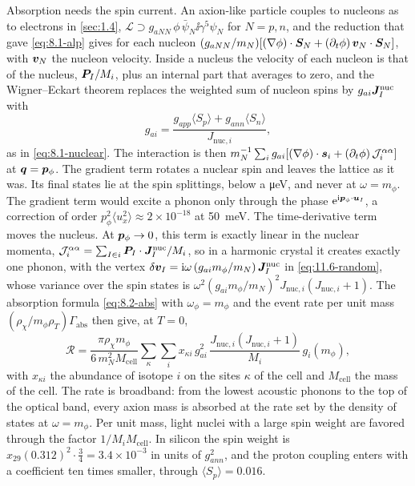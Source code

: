 Absorption needs the spin current. An axion-like particle couples to nucleons as to electrons in \cref{sec:1.4}, $\mathcal{L} \supset g_{aNN}\,\phi\,\bar\psi_N\ii\gamma^5\psi_N$ for $N = p, n$, and the reduction that gave \cref{eq:8.1-alp} gives for each nucleon $(g_{aNN}/m_N)[(\nabla\phi)\cdot\bm{S}_N + (\partial_t\phi)\,\bm{v}_N\cdot\bm{S}_N]$, with $\bm{v}_N$ the nucleon velocity. Inside a nucleus the velocity of each nucleon is that of the nucleus, $\bm{P}_I/M_i$, plus an internal part that averages to zero, and the Wigner--Eckart theorem replaces the weighted sum of nucleon spins by $g_{ai}\bm{J}^{\mathrm{nuc}}_I$ with
\begin{equation*}
  g_{ai} = \frac{g_{app}\langle S_p\rangle + g_{ann}\langle S_n\rangle}{J_{\mathrm{nuc},i}} ,
\end{equation*}
as in \cref{eq:8.1-nuclear}. The interaction is then $m_N^{-1}\sum_ig_{ai}[(\nabla\phi)\cdot\bm{s}_i + (\partial_t\phi)\,\mathcal{J}^{\alpha\alpha}_i]$ at $\bm{q} = \bm{p}_\phi$. The gradient term rotates a nuclear spin and leaves the lattice as it was. Its final states lie at the spin splittings, below a \si{\micro eV}, and never at $\omega = m_\phi$. The gradient term would excite a phonon only through the phase $\mathrm{e}^{\mathrm{i}\bm{p}_\phi\cdot\bm{u}_I}$, a correction of order $p_\phi^2\langle u_x^2\rangle \approx 2\times10^{-18}$ at \SI{50}{meV}. The time-derivative term moves the nucleus. At $\bm{p}_\phi \to 0$, this term is exactly linear in the nuclear momenta, $\mathcal{J}^{\alpha\alpha}_i = \sum_{I\in i}\bm{P}_I\cdot\bm{J}^{\mathrm{nuc}}_I/M_i$, so in a harmonic crystal it creates exactly one phonon, with the vertex $\delta\bm{v}_I = \mathrm{i}\omega\,(g_{ai}m_\phi/m_N)\,\bm{J}^{\mathrm{nuc}}_I$ in \cref{eq:11.6-random}, whose variance over the spin states is $\omega^2(g_{ai}m_\phi/m_N)^2J_{\mathrm{nuc},i}(J_{\mathrm{nuc},i} + 1)$. The absorption formula \cref{eq:8.2-abs} with $\omega_\phi = m_\phi$ and the event rate per unit mass $(\rho_\chi/m_\phi\rho_T)\varGamma_{\mathrm{abs}}$ then give, at $T = 0$,
\begin{equation}
  \mathcal{R} = \frac{\pi\rho_\chi m_\phi}{6\,m_N^2M_{\mathrm{cell}}}\sum_{\kappa}\sum_ix_{\kappa i}\,g_{ai}^2\,\frac{J_{\mathrm{nuc},i}(J_{\mathrm{nuc},i} + 1)}{M_i}\,g_i(m_\phi) ,
  \label{eq:11.6-alp}
\end{equation}
with $x_{\kappa i}$ the abundance of isotope $i$ on the sites $\kappa$ of the cell and $M_{\mathrm{cell}}$ the mass of the cell. The rate is broadband: from the lowest acoustic phonons to the top of the optical band, every axion mass is absorbed at the rate set by the density of states at $\omega = m_\phi$. Per unit mass, light nuclei with a large spin weight are favored through the factor $1/M_iM_{\mathrm{cell}}$. In silicon the spin weight is $x_{29}(0.312)^2\cdot\frac34 = 3.4\times10^{-3}$ in units of $g_{ann}^2$, and the proton coupling enters with a coefficient ten times smaller, through $\langle S_p\rangle = 0.016$.

